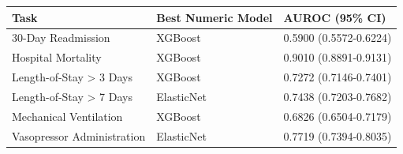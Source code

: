\begin{tabular}{lll}
\toprule
Task & Best Numeric Model & AUROC (95\% CI) \\
\midrule
30-Day Readmission & XGBoost & 0.5900 (0.5572-0.6224) \\
Hospital Mortality & XGBoost & 0.9010 (0.8891-0.9131) \\
Length-of-Stay \textgreater{} 3 Days & XGBoost & 0.7272 (0.7146-0.7401) \\
Length-of-Stay \textgreater{} 7 Days & ElasticNet & 0.7438 (0.7203-0.7682) \\
Mechanical Ventilation & XGBoost & 0.6826 (0.6504-0.7179) \\
Vasopressor Administration & ElasticNet & 0.7719 (0.7394-0.8035) \\
\bottomrule
\end{tabular}
